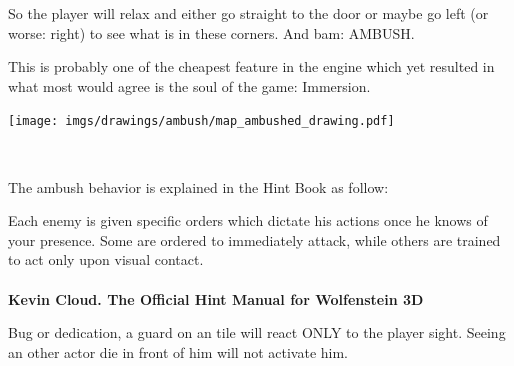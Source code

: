 \par
\begin{minipage}{1\textwidth}
  \begin{figure}[H]
   \centering
  \end{figure}
  \par
  \begin{minipage}{0.6\textwidth}
  So the player will relax and either go straight to the door or maybe go left (or worse: right) to see what is in these corners. And bam: AMBUSH.\\
  \par
   This is probably one of the cheapest feature in the engine which yet resulted in what most would agree is the soul of the game: Immersion.
  \end{minipage}
  \begin{minipage}{0.4\textwidth}
  \begin{flushright}
  \texttt{[image: imgs/drawings/ambush/map\_ambushed\_drawing.pdf]}
  \end{flushright}
  \end{minipage}
\end{minipage}
\noindent
\\


\par

 The ambush behavior is explained in the Hint Book as follow:\\
\par
\begin{fancyquotes}
Each enemy is given specific orders which dictate his actions once he knows of your presence. Some are ordered to immediately attack, while others are trained to act only upon visual contact.
 \bigskip \\
\bigskip \\
\textbf{Kevin Cloud. The Official Hint Manual for Wolfenstein 3D}
 \end{fancyquotes}

 Bug or dedication, a guard on an  tile will react ONLY to the player sight. Seeing an other actor die in front of him will not activate him.\\


